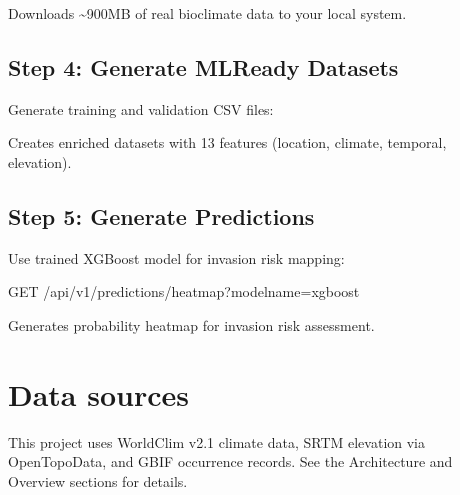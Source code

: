 \documentclass[letterpaper,10pt,english]{sphinxmanual}
\begin{document}
\begin{sphinxVerbatim}[commandchars=\\\{\}]
 
\end{sphinxVerbatim}

\sphinxAtStartPar
Downloads \textasciitilde{}900MB of real bioclimate data to your local system.


\subsection{Step 4: Generate ML\sphinxhyphen{}Ready Datasets}
\label{\detokenize{user_guide:step-4-generate-ml-ready-datasets}}
\sphinxAtStartPar
Generate training and validation CSV files:

\begin{sphinxVerbatim}[commandchars=\\\{\}]
 
    
\end{sphinxVerbatim}

\sphinxAtStartPar
Creates enriched datasets with 13 features (location, climate, temporal, elevation).


\subsection{Step 5: Generate Predictions}
\label{\detokenize{user_guide:step-5-generate-predictions}}
\sphinxAtStartPar
Use trained XGBoost model for invasion risk mapping:

\begin{sphinxVerbatim}[commandchars=\\\{\}]
GET /api/v1/predictions/heatmap?model\PYGZus{}name=xgboost
\end{sphinxVerbatim}

\sphinxAtStartPar
Generates probability heatmap for invasion risk assessment.


\section{Data sources}
\label{\detokenize{user_guide:data-sources}}
\sphinxAtStartPar
This project uses WorldClim v2.1 climate data, SRTM elevation via Open\sphinxhyphen{}Topo\sphinxhyphen{}Data, and GBIF occurrence records. See the Architecture and Overview sections for details.
\end{document}

